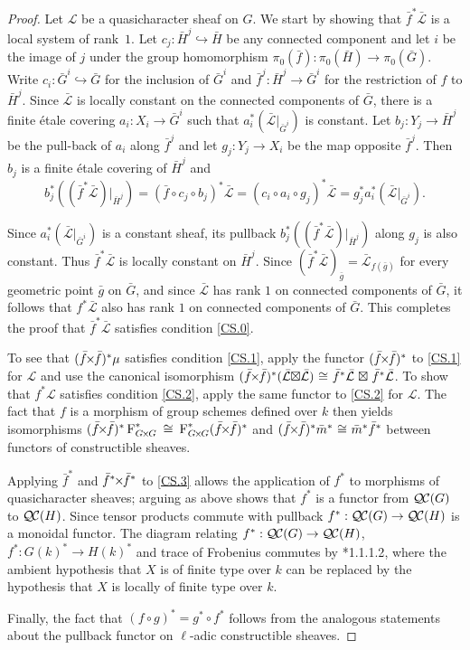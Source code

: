 \documentclass[11pt]{amsart}
\theoremstyle{plain}
\theoremstyle{definition}
\theoremstyle{remark}
\newcommand{\Fq}{k}
\newcommand{\Frob}[1]{\operatorname{F}_{#1}}
\newcommand{\iso}{{\ \cong\ }}
\newcommand{\qcs}[1]{{\mathcal{#1}}}
\newcommand{\gqcs}[1]{{\mathcal{\bar #1}}}
\newcommand{\QC}{{\mathcal{Q\hskip-0.8pt C}}}
\renewcommand{\bf}{\bar{f}}
\newcommand{\bg}{\bar{g}}
\newcommand{\bm}{\bar{m}}
\newcommand{\bG}{\bar{G}}
\newcommand{\bH}{\bar{H}}
\newcommand{\tight}[3]{\hspace{-#1pt}{#2}\hspace{-#3pt}}
\newcommand{\bfxf}{\text{$\bar{f} \tight{1}{\times}{1} \bar{f}$}}
\newcommand{\GxxG}{\text{$G \tight{1}{\times}{1} G$}}
\newcommand{\LxL}{\text{$\gqcs{L} \tight{0}{\boxtimes}{0} \gqcs{L}$}}
\begin{document}
\begin{proof}
  Let $\qcs{L}$ be a quasicharacter sheaf on $G$. We start by showing that
  $\bf^*\gqcs{L}$ is a local system of rank~$1$. Let $c_j :\bH^j \hookrightarrow \bH$ be any
  connected component and let $i$ be the image of $j$ under the group
  homomorphism $\pi_0(\bf) : \pi_0(\bH) \to \pi_0(\bG)$.
  Write $c_i : \bG^i \hookrightarrow \bG$ for
  the inclusion of $\bG^i$ and $\bf^j : \bH^j \to \bG^i$
  for the restriction of $f$ to $\bH^j$.  Since $\gqcs{L}$ is locally constant on the connected
  components of $\bG$, there is a finite \'etale covering
  $a_i : X_i \to \bG^i$ such that $a_i^* (\gqcs{L}\vert_{\bG^i})$
  is constant. Let $b_j : Y_j \to \bH^j$ be the
  pull-back of $a_i$ along $\bf^j$ and let $g_j : Y_j \to X_i$ be
  the map opposite $\bf^j$. Then $b_j$ is a finite \'etale covering
  of $\bH^j$ and
  \[
  b_j^* \left( (\bf^* \gqcs{L})\vert_{\bH^j}\right)
  = (\bf\circ c_j \circ b_j)^*\gqcs{L}
  = (c_i\circ a_i\circ g_j)^*\gqcs{L} = g_j^* a_i^* (\gqcs{L}\vert_{\bG^i}).
  \]

  Since $a_i^* (\gqcs{L}\vert_{\bG^i})$ is a constant sheaf, its pullback
  $b_j^* \left( (\bf^*\gqcs{L})\vert_{\bH^j}\right)$ along $g_j$ is also constant.
  Thus $\bf^*\gqcs{L}$ is locally constant on
  $\bH^j$. Since $(\bf^*\gqcs{L})_{\bg} = \gqcs{L}_{f(\bg)}$ for every
  geometric point ${\bg}$ on $\bG$, and since $\gqcs{L}$ has
  rank $1$ on connected components of $\bG$, it follows that
  $f^*\gqcs{L}$ also has rank $1$ on connected components of $\bG$.
  This completes the proof that $\bf^*\gqcs{L}$ satisfies condition \ref{CS.0}.

  To see that $(\bfxf)^* \mu$ satisfies
  condition \ref{CS.1}, apply the functor $(\bfxf)^*$
  to \ref{CS.1} for $\qcs{L}$ and use the canonical isomorphism
  $(\bfxf)^*(\LxL) \iso \bf^*\gqcs{L} \tight{-3}{\boxtimes}{-3} \bf^*\gqcs{L}$.
  To show that $f^*\qcs{L}$ satisfies condition
  \ref{CS.2}, apply the same functor to \ref{CS.2} for $\qcs{L}$.
  The fact that $f$ is a morphism of group schemes defined over $\Fq$ then
  yields isomorphisms $(\bfxf)^*\Frob{\GxxG}^* \iso \Frob{\GxxG}^* (\bfxf)^*$
  and $(\bfxf)^* \bm^*\iso \bm^* \bf^*$ between functors of constructible sheaves.
  
  Applying $\bf^*$ and $\bf^* \tight{1}{\times}{1}\bf^*$ to \ref{CS.3} allows the application
  of $f^*$ to morphisms of quasicharacter sheaves; arguing as above shows that $f^*$ is
  a functor from $\QC(G)$ to $\QC(H)$.  Since tensor products commute with pullback
  $f^* : \QC(G) \to \QC(H)$ is a monoidal functor.
%
  The diagram relating $f^* : \QC(G) \to \QC(H)$, $f^* : G(k)^* \to H(k)^*$ and trace of Frobenius
  commutes by \cite{laumon:87a}*{1.1.1.2}, where the ambient
  hypothesis that $X$ is of finite type over $\Fq$ can be replaced by
  the hypothesis that $X$ is locally of finite type over $\Fq$.
  
  Finally, the fact that $(f\circ g)^* = g^* \circ f^*$ follows from the analogous
  statements about the pullback functor on $\ell$-adic constructible sheaves.
\end{proof}
\end{document}
